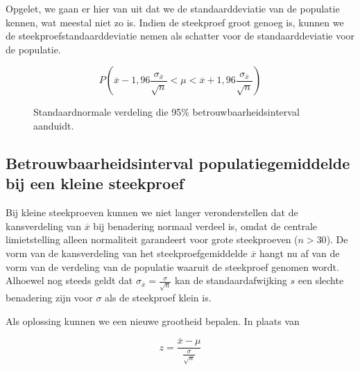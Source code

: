 Opgelet, we gaan er hier van uit dat we de standaarddeviatie van de populatie kennen, wat meestal niet zo is. Indien de steekproef groot genoeg is, kunnen we de steekproefstandaarddeviatie nemen als schatter voor de standaarddeviatie voor de populatie.

\[ P ( \overline{x} -1,96 \frac{\sigma_{\overline{x}}}{\sqrt{n}} < \mu < \overline{x} + 1,96 \frac{\sigma_{\overline{x}}}{\sqrt{n}}) \]


\begin{figure}[t]
\centering
{}
\caption{Standaardnormale verdeling die 95\% betrouwbaarheidsinterval aanduidt.}
\label{fig:verdelingStandaardnormaal}
\end{figure}

\subsection{Betrouwbaarheidsinterval populatiegemiddelde bij een kleine steekproef}
\label{ssec:betrouwbaarheidsinterval-kleine-steekproef}

Bij kleine steekproeven kunnen we niet langer veronderstellen dat de kansverdeling van $\overline{x}$ bij benadering
normaal verdeel is, omdat de centrale limietstelling alleen normaliteit garandeert voor grote steekproeven ($n >30$). De vorm
van de kansverdeling van het steekproefgemiddelde $\overline{x}$ hangt nu af van de vorm van de verdeling van de populatie waaruit de
steekproef genomen wordt. Alhoewel nog steeds geldt dat $\sigma_{\overline{x}} = \frac{\sigma}{\sqrt{n}}$ kan
de standaardafwijking $s$ een slechte benadering zijn voor $\sigma$ als de steekproef klein is.

Als oplossing kunnen we een nieuwe grootheid bepalen. In plaats van

\[ z = \frac{\overline{x} - \mu}{\frac{\sigma}{\sqrt{n}}} \]

